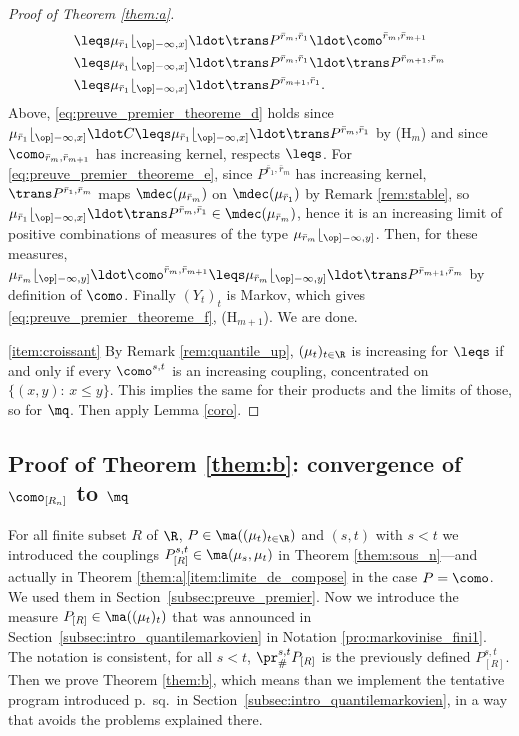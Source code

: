 \begin{proof}[Proof of Theorem \ref{them:a}]
\begin{align}
&\leqs\mu_{\bar r_1}\lfloor_{\op]-\infty,x]}{}\ldot\trans P^{\bar r_m,\bar r_1}{}\ldot\como^{\bar r_{m},\bar r_{m+1}}\label{eq:preuve_premier_theoreme_d}\\
&\leqs \mu_{\bar r_1}\lfloor_{\op]-\infty,x]}{}\ldot\trans P^{\bar r_m,\bar r_1}{}\ldot\trans P^{\bar r_{m+1},\bar r_m}\label{eq:preuve_premier_theoreme_e}\\
&\leqs \mu_{\bar r_1}\lfloor_{\op]-\infty,x]}{}\ldot\trans P^{\bar r_{m+1},\bar r_1}\label{eq:preuve_premier_theoreme_f}.
\end{align}
Above, \eqref{eq:preuve_premier_theoreme_d} holds since $\mu_{\bar r_1}\lfloor_{\op]-\infty,x]}{}\ldot C\leqs\mu_{\bar r_1}\lfloor_{\op]-\infty,x]}{}\ldot\trans P^{\bar r_m,\bar r_1}$ by (H$_m$) and since $\como_{\bar r_{m},\bar r_{m+1}}$ has increasing kernel, \ie respects $\leqs$. For \eqref{eq:preuve_premier_theoreme_e}, since $P^{\bar r_1,\bar r_m}$ has increasing kernel, $\trans P^{\bar r_1,\bar r_m}$ maps $\mdec(\mu_{\bar r_m})$ on $\mdec(\mu_{\bar r_1})$ by Remark \ref{rem:stable}, so $\mu_{\bar r_1}\lfloor_{\op]-\infty,x]}{}\ldot\trans P^{\bar r_m,\bar r_1}\in\mdec(\mu_{\bar r_m})$, hence it is an increasing limit of positive combinations of measures of the type $\mu_{\bar r_m}\lfloor_{\op]-\infty,y]}$. Then, for these measures, $\mu_{\bar r_m}\lfloor_{\op]-\infty,y]}{}\ldot\como^{\bar r_m,\bar r_{m+1}}\leqs\mu_{\bar r_m}\lfloor_{\op]-\infty,y]}{}\ldot\trans P^{\bar r_{m+1},\bar r_m}$ by definition of $\como$. Finally $(Y_t)_t$ is Markov, which gives \eqref{eq:preuve_premier_theoreme_f}, \ie (H$_{m+1}$). We are done. 

\eqref{item:croissant}
By Remark \ref{rem:quantile_up}, $(\mu_t)_{t\in\R}$ is increasing for $\leqs$ if and only if every $\como^{s,t}$ is an increasing coupling, \ie concentrated on $\{(x,y):\,x\leqslant y\}$. This implies the same for their products and the limits of those, so for $\mq$. Then apply Lemma \ref{coro}.
\end{proof}

\subsection{Proof of Theorem \ref{them:b}: convergence of \mb$\como_{[R_n]}$ to $\mq$\mn}\label{subsec:preuve_deuxieme} For all finite subset $R$ of $\R$, $P\in\ma((\mu_t)_{t\in\R})$ and $(s,t)$ with $s<t$ we introduced the couplings $P_{[R]}^{s,t}\in\ma(\mu_s,\mu_t)$ in Theorem \ref{them:sous_n}---and actually in Theorem \ref{them:a}\eqref{item:limite_de_compose} in the case $P=\como$. We used them in Section~\ref{subsec:preuve_premier}. Now we introduce the measure $P_{[R]}\in\ma((\mu_t)_{t})$ that was announced in Section~\ref{subsec:intro_quantilemarkovien} in Notation \ref{pro:markovinise_fini1}. The notation is consistent, \ie for all $s<t$, $\pr^{s,t}_\#P_{[R]}$ is the previously defined $P_{[R]}^{s,t}$. Then we prove Theorem \ref{them:b}, which means than we implement the tentative program introduced p.\,\pageref{page:tentative_limite} sq.\ in Section~\ref{subsec:intro_quantilemarkovien}, in a way that avoids the problems explained there.

